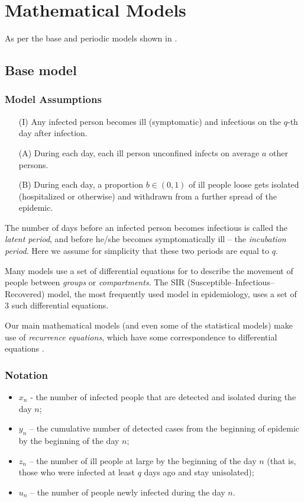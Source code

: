 \section{Mathematical Models}
\label{ch:mathmodel}

As per the base and periodic models shown in \cite{grigor20}.

\subsection{Base model}

\subsubsection{Model Assumptions}
\begin{itemize}
    \item[(I)] Any infected person becomes ill (symptomatic) and infectious on the $q$-th day after infection.
    \item[(A)] During each day, each ill person unconfined infects on average $a$ other persons.
    \item[(B)] During each day, a proportion $b\in (0,1)$ of ill people loose gets isolated (hospitalized or otherwise) and withdrawn from a further spread of the epidemic.
\end{itemize}

\begin{nremark}
The number of days before an infected person becomes infectious is called the \textit{latent period}, and before he/she becomes symptomatically ill – the \textit{incubation period}. Here we assume for simplicity that these two periods are equal to $q$.
\end{nremark}

Many models use a set of differential equations for to describe the movement of people between \textit{groups} or \textit{compartments}. The SIR (Susceptible–Infectious–Recovered) model, the most frequently used model in epidemiology, uses a set of 3 such differential equations. 

Our main mathematical models (and even some of the statistical models) make use of \textit{recurrence equations}, which have some correspondence to differential equations \cite{AGARWAL20021}.

\subsubsection{Notation}
\begin{itemize}
    \item $x_n$ - the number of infected people that are detected and isolated during the day $n$;
    \item $y_n$ – the cumulative number of detected cases from the beginning of epidemic by the beginning of the day $n$;
    \item $z_n$ – the number of ill people at large by the beginning of the day $n$ (that is, those who were infected at least $q$ days ago and stay unisolated);
    \item $u_n$ – the number of people newly infected during the day $n$.
\end{itemize}


